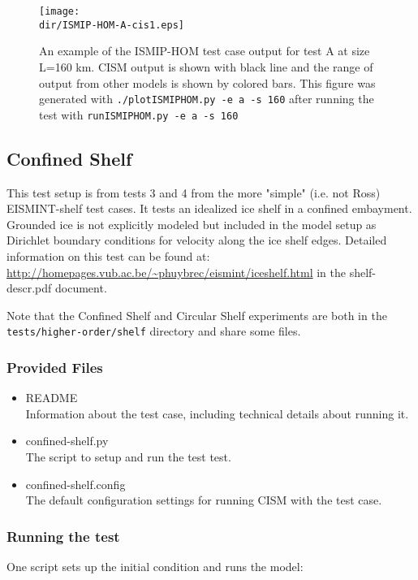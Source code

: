 \begin{figure}[H!]
	\centering
	\texttt{[image: \\dir/ISMIP-HOM-A-cis1.eps]}
	\caption{An example of the ISMIP-HOM test case output for test A at size L=160 km. 
CISM output is shown with black line and the range of output from other models is shown by colored bars. 
This figure was generated with \texttt{./plotISMIPHOM.py -e a -s 160} after running the test with \texttt{runISMIPHOM.py -e a -s 160}}
	\label{fig:ismiphom-results}
\end{figure}
\FloatBarrier

\subsection{Confined Shelf}
This test setup is from tests 3 and 4 from the more "simple"
(i.e. not Ross) EISMINT-shelf test cases.  It tests an idealized ice shelf in a 
confined embayment.  Grounded ice is not explicitly modeled but included in the 
model setup as Dirichlet boundary conditions for velocity along the ice shelf edges.
Detailed information on this test can be found at:
\url{http://homepages.vub.ac.be/~phuybrec/eismint/iceshelf.html}
in the shelf-descr.pdf document.

Note that the Confined Shelf and Circular Shelf experiments are both in the 
\texttt{tests/higher-order/shelf} directory and share some files.

\subsubsection{Provided Files}

\begin{itemize}
	\item README \\
		Information about the test case, including technical details about running it.
	\item confined-shelf.py \\
		The script to setup and run the test test.
	\item confined-shelf.config \\
  The default configuration settings for running CISM with the test case.
\end{itemize}

\subsubsection{Running the test}
One script sets up the initial condition and runs the model:

